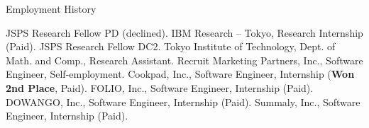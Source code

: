 \begin{rubric}{Employment History}

  \entry*[2023.04 -- 2023.4] JSPS Research Fellow PD (declined).
  \entry*[2021.08 -- 2021.10] IBM Research -- Tokyo, Research Internship (Paid).
  \entry*[2021.04 -- 2023.3] JSPS Research Fellow DC2.
  \entry*[2020.11 -- 2023.3] Tokyo Institute of Technology, Dept. of Math. and Comp.,
  Research Assistant.
  \entry*[2018.6 -- 2019.2] Recruit Marketing Partners, Inc., Software Engineer,
  Self-employment.
  \entry*[2018.8] Cookpad, Inc., Software Engineer, Internship (\textbf{Won 2nd
    Place}, Paid).
  \entry*[2017.4 -- 2018.3] FOLIO, Inc., Software Engineer, Internship (Paid).
  \entry*[2016.8 -- 2017.3] DOWANGO, Inc., Software Engineer, Internship (Paid).
  \entry*[2016.1 -- 2016.6] Summaly, Inc., Software Engineer, Internship (Paid).
%
\end{rubric}
